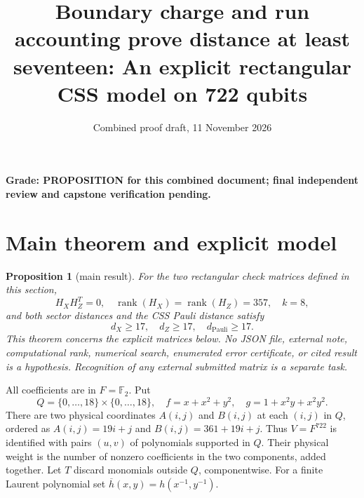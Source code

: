 \documentclass{article}
\title{Boundary charge and run accounting prove distance at least seventeen: An explicit rectangular CSS model on 722 qubits}
\author{}
\date{Combined proof draft, 11 November 2026}
\newtheorem{proposition}{Proposition}
\DeclareMathOperator{\rank}{rank}
\newcommand{\Ftwo}{\mathbb{F}_2}
\begin{document}
\maketitle

\textbf{Grade: PROPOSITION for this combined document; final independent review and
  capstone verification pending.}

\section{Main theorem and explicit model}\label{sec:model}

\begin{proposition}[main result]\label{prop:main}
  For the two rectangular check matrices defined in this section,
  \begin{equation}
    H_X H_Z^T = 0, \quad
    \rank(H_X) = \rank(H_Z) = 357, \quad k = 8,
  \end{equation}
  and both sector distances and the CSS Pauli distance satisfy
  \begin{equation}
    d_X \ge 17, \quad d_Z \ge 17, \quad d_{\text{Pauli}} \ge 17.
  \end{equation}
  This theorem concerns the explicit matrices below. No JSON file, external note,
  computational rank, numerical search, enumerated error certificate, or cited result is a
  hypothesis. Recognition of any external submitted matrix is a separate task.
\end{proposition}

All coefficients are in \(F = \Ftwo\). Put
\begin{equation}
  Q = \{0, \dots, 18\} \times \{0, \dots, 18\}, \quad
  f = x + x^2 + y^2, \quad g = 1 + x^2 y + x^2 y^2.
\end{equation}
There are two physical coordinates \(A(i,j)\) and \(B(i,j)\) at each \((i,j)\) in \(Q\),
ordered as \(A(i,j) = 19i + j\) and \(B(i,j) = 361 + 19i + j\). Thus \(V = F^{722}\) is
identified with pairs \((u,v)\) of polynomials supported in \(Q\). Their physical weight is
the number of nonzero coefficients in the two components, added together. Let \(T\) discard
monomials outside \(Q\), componentwise. For a finite Laurent polynomial set
\(\overline{h}(x,y) = h(x^{-1}, y^{-1})\).
\end{document}
